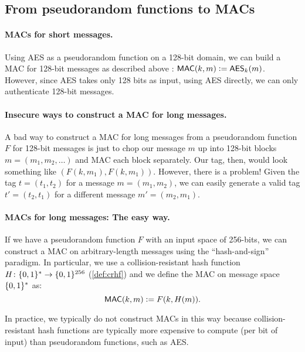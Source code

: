 \subsection{From pseudorandom functions to MACs}

\paragraph{MACs for short messages.}
Using AES as a pseudorandom function on a 128-bit domain,
we can build a MAC for 128-bit messages as described above
: $\mathsf{MAC}(k, m) \mathrel{\mathop:}= \mathsf{AES}_k(m)$. 
However, since AES takes only 128 bits as input, using AES
directly, we can only authenticate 128-bit messages. 

\paragraph{Insecure ways to construct a MAC for long messages.}
A bad way to construct a MAC for long messages from a pseudorandom 
function $F$ for 128-bit messages is
just to chop our message $m$ up into 128-bit blocks
$m = (m_1, m_2, \dots)$
and MAC each block separately.
Our tag, then, would look something like $\left(F(k,m_1), F(k,m_1)\right)$.
However, there is a problem! Given the tag $t = (t_1, t_2)$ for a message $m=(m_1, m_2)$, we can easily generate a valid tag 
$t' = (t_2, t_1)$ for a different message $m'=(m_2, m_1)$. 

\paragraph{MACs for long messages: The easy way.}
If we have a pseudorandom function $F$ with an input space of 256-bits,
we can construct a MAC on arbitrary-length messages using the ``hash-and-sign'' paradigm.
In particular, we use a collision-resistant hash function $H\colon \{0,1\}^* \to \{0,1\}^{256}$ 
(\cref{def:crhf}) and we define the MAC on message space $\{0,1\}^*$ as:
\[ \mathsf{MAC}(k,m) \mathrel{\mathop:}= F(k, H(m)).\]


In practice, we typically do not construct MACs in this way because
collision-resistant hash functions are typically more expensive to
compute (per bit of input) than pseudorandom functions, such as AES.

